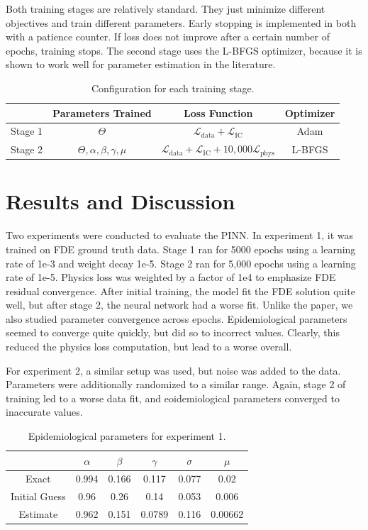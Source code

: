 \documentclass{article}
\begin{document}
	Both training stages are relatively standard. They just minimize different objectives and train different parameters. Early stopping is implemented in both with a patience counter. If loss does not improve after a certain number of epochs, training stops. The second stage uses the L-BFGS optimizer, because it is shown to work well for parameter estimation in the literature.
		
	\begin{table}
		\centering
		\caption{Configuration for each training stage.}
		\begin{tabular}{c|ccc}
			 & Parameters Trained & Loss Function & Optimizer \\
			\hline
			Stage 1 & $\Theta$ & $\mathcal{L}_{\mathrm{data}} + \mathcal{L}_{\mathrm{IC}}$ & Adam \\
			Stage 2 & $\Theta, \alpha, \beta, \gamma, \mu$ & $\mathcal{L}_{\mathrm{data}} + \mathcal{L}_{\mathrm{IC}} + 10,000 \mathcal{L}_{\mathrm{phys}}$ & L-BFGS
		\end{tabular}
		\label{table:stages}
	\end{table}
	
	\section{Results and Discussion}
	\label{section:Results_and_Discussion}
	
	Two experiments were conducted to evaluate the PINN. In experiment 1, it was trained on FDE ground truth data. Stage 1 ran for 5000 epochs using a learning rate of 1e-3 and weight decay 1e-5. Stage 2 ran for 5,000 epochs using a learning rate of 1e-5. Physics loss was weighted by a factor of 1e4 to emphasize FDE residual convergence. After initial training, the model fit the FDE solution quite well, but after stage 2, the neural network had a worse fit. Unlike the paper, we also studied parameter convergence across epochs. Epidemiological parameters seemed to converge quite quickly, but did so to incorrect values. Clearly, this reduced the physics loss computation, but lead to a worse overall.
		
	For experiment 2, a similar setup was used, but noise was added to the data. Parameters were additionally randomized to a similar range. Again, stage 2 of training led to a worse data fit, and eoidemiological parameters converged to inaccurate values.
	
	\begin{table}
		\centering
		\caption{Epidemiological parameters for experiment 1.}
		\begin{tabular}{c|ccccc}
			 & $\alpha$ & $\beta$ & $\gamma$ & $\sigma$ & $\mu$ \\
			 \hline
			 Exact & 0.994 & 0.166 & 0.117 & 0.077 & 0.02 \\
			 \hline
			 Initial Guess & 0.96 & 0.26 & 0.14 & 0.053 & 0.006 \\
			 Estimate & 0.962 & 0.151 & 0.0789 & 0.116 & 0.00662
		\end{tabular}
		\label{table:experiment1}
	\end{table}
	
\end{document}
